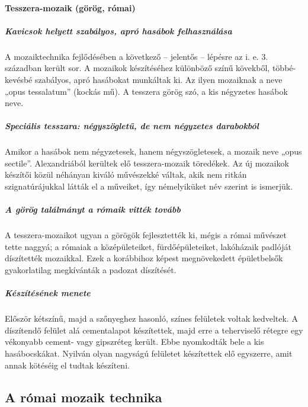 
\paragraph{Tesszera-mozaik (görög, római)}

\subparagraph{Kavicsok helyett szabályos, apró hasábok felhasználása}
A mozaiktechnika fejlődésében a következő – jelentős – lépésre az i. e. 3. században került sor. A mozaikok készítéséhez különböző színű kövekből, többé-kevésbé szabályos, apró hasábokat munkáltak ki. Az ilyen mozaiknak a neve „opus tessalatum” (kockás mű). A tesszera görög szó, a kis négyzetes hasábok neve.

\subparagraph{Speciális tesszara: négyszögletű, de nem négyzetes darabokból}
Amikor a hasábok nem négyzetesek, hanem négyszögletesek, a mozaik neve „opus sectile”. Alexandriából kerültek elő tesszera-mozaik töredékek. Az új mozaikok készítői közül néhányan kiváló művészekké váltak, akik nem ritkán szignatúrájukkal látták el a műveiket, így némelyiküket név szerint is ismerjük.

\subparagraph{A görög találmányt a rómaik vitték tovább}
A tesszera-mozaikot ugyan a görögök fejlesztették ki, mégis a római művészet tette naggyá; a rómaiak a középületeiket, fürdőépületeiket, lakóházaik padlóját díszítették mozaikkal. Ezek a korábbihoz képest megnövekedett épületbelsők gyakorlatilag megkívánták a padozat díszítését.


\subparagraph{Készítésének menete}
Először kétszínű, majd a szőnyeghez hasonló, színes felületek voltak kedveltek. A díszítendő felület alá cementalapot készítettek, majd erre a teherviselő rétegre egy vékonyabb cement- vagy gipszréteg került. Ebbe nyomkodták bele a kis hasábocskákat. Nyilván olyan nagyságú felületet készítettek elő egyszerre, amit annak kötéséig el tudtak készíteni.

\subsection*{A római mozaik technika}

